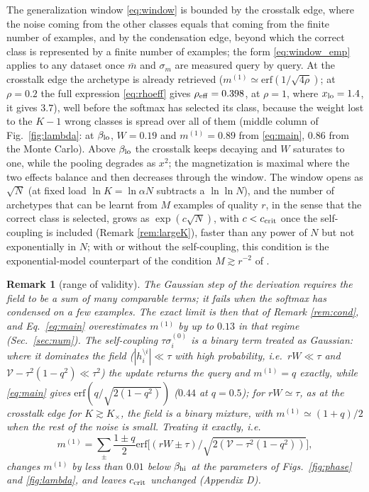 \documentclass[11pt,a4paper]{article}
\newtheorem{remark}{Remark}
\newcommand{\erf}{\mathrm{erf}}
\begin{document}
The generalization window \eqref{eq:window} is bounded by the crosstalk edge, where the noise coming from the other classes equals that coming from the finite number of examples, and by the condensation edge, beyond which the correct class is represented by a finite number of examples; the form \eqref{eq:window_emp} applies to any dataset once $\bar m$ and $\sigma_m$ are measured query by query. At the crosstalk edge the archetype is already retrieved ($m^{(1)}\simeq\erf(1/\sqrt{4\rho})$; at $\rho=0.2$ the full expression \eqref{eq:rhoeff} gives $\rho_{\rm eff}=0.398$, at $\rho=1$, where $x_{\rm lo}=1.4$, it gives $3.7$), well before the softmax has selected its class, because the weight lost to the $K-1$ wrong classes is spread over all of them (middle column of Fig.\ \ref{fig:lambda}: at $\beta_{\rm lo}$, $W=0.19$ and $m^{(1)}=0.89$ from \eqref{eq:main}, $0.86$ from the Monte Carlo). Above $\beta_{\rm lo}$ the crosstalk keeps decaying and $W$ saturates to one, while the pooling degrades as $x^2$; the magnetization is maximal where the two effects balance and then decreases through the window. The window opens as $\sqrt N$ (at fixed load $\ln K=\ln\alpha N$ subtracts a $\ln\ln N$), and the number of archetypes that can be learnt from $M$ examples of quality $r$, in the sense that the correct class is selected, grows as $\exp(c\sqrt N)$, with $c<c_{\rm crit}$ once the self-coupling is included (Remark \ref{rem:largeK}), faster than any power of $N$ but not exponentially in $N$; with or without the self-coupling, this condition is the exponential-model counterpart of the condition $M\gtrsim r^{-2}$ of \cite{Alemanno2023}.

\begin{remark}[range of validity]\label{rem:limits}
The Gaussian step of the derivation requires the field to be a sum of many comparable terms; it fails when the softmax has condensed on a few examples. The exact limit is then that of Remark \ref{rem:cond}, and Eq.\ \eqref{eq:main} overestimates $m^{(1)}$ by up to $0.13$ in that regime (Sec.\ \ref{sec:num}). The self-coupling $\tau\sigma^{(0)}_i$ is a binary term treated as Gaussian: where it dominates the field ($|h^{\setminus i}_i|\ll\tau$ with high probability, i.e.\ $rW\ll\tau$ and $\mathcal V-\tau^2(1-q^2)\ll\tau^2$) the update returns the query and $m^{(1)}=q$ exactly, while \eqref{eq:main} gives $\erf(q/\sqrt{2(1-q^2)})$ ($0.44$ at $q=0.5$); for $rW\simeq\tau$, as at the crosstalk edge for $K\gtrsim K_\times$, the field is a binary mixture, with $m^{(1)}\simeq(1+q)/2$ when the rest of the noise is small. Treating it exactly, i.e.\
\begin{equation*}
m^{(1)}=\sum_\pm\frac{1\pm q}{2}\erf\big[(rW\pm\tau)/\sqrt{2(\mathcal V-\tau^2(1-q^2))}\big],
\end{equation*}
changes $m^{(1)}$ by less than $0.01$ below $\beta_{\rm hi}$ at the parameters of Figs.\ \ref{fig:phase} and \ref{fig:lambda}, and leaves $c_{\rm crit}$ unchanged (Appendix D).
\end{remark}
\end{document}
